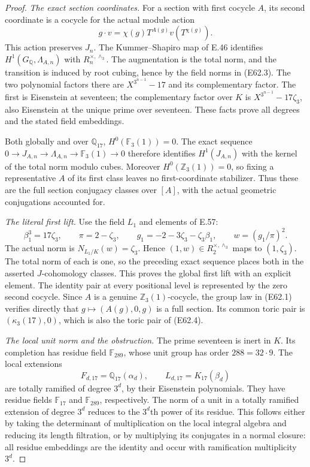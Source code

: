 \begin{proof}
\emph{The exact section coordinates.}
For a section with first cocycle $A$, its
second coordinate is a cocycle for the
actual module action
\[
       g\cdot v=\chi(g)T^{A(g)}
                                 v(T^{\chi(g)}).
 \tag{E62.10}
\]
This action preserves $J_n$.
The Kummer--Shapiro map of E.46 identifies
$H^1(G_{\mathbb Q},\Lambda_{A,n})$
with $R_n^{\times,\wedge_3}$.
The augmentation is the total norm,
and the transition is induced by
root cubing, hence by the field norms
in (E62.3).
The two polynomial factors there are
$X^{3^{n-1}}-17$ and its complementary
factor. The first is Eisenstein at
seventeen; the complementary factor
over $K$ is
$X^{3^{n-1}}-17\zeta_3$, also
Eisenstein at the unique prime over
seventeen. These facts prove all
degrees and the stated field
embeddings.

Both globally and over $\mathbb Q_{17}$,
$H^0(\mathbb F_3(1))=0$.
The exact sequence
$0\to J_{A,n}\to\Lambda_{A,n}
\to\mathbb F_3(1)\to0$ therefore
identifies $H^1(J_{A,n})$ with the
kernel of the total norm modulo cubes.
Moreover $H^0(\mathbb Z_3(1))=0$,
so fixing a representative $A$ of its
first class leaves no first-coordinate
stabilizer. Thus these are the full
section conjugacy classes over $[A]$,
with the actual geometric conjugations
accounted for.

\emph{The literal first lift.}
Use the field $L_1$ and elements of E.57:
\[
 \beta_1^3=17\zeta_3,\qquad
 \pi=2-\zeta_3,\qquad
 g_1=-2-3\zeta_3-\zeta_3\beta_1,\qquad
 w=(g_1/\pi)^2 .
 \tag{E62.11}
\]
The actual norm is
$N_{L_1/K}(w)=\zeta_3$.
Hence $(1,w)\in R_2^{\times,\wedge_3}$
maps to $(1,\zeta_3)$.
The total norm of each is one,
so the preceding exact sequence places
both in the asserted $J$-cohomology
classes. This proves the global first
lift with an explicit element.
The identity pair at every positional
level is represented by the zero
second cocycle. Since $A$ is a genuine
$\mathbb Z_3(1)$-cocycle, the group law
in (E62.1) verifies directly that
$g\mapsto(A(g),0,g)$ is a full
section. Its common toric pair is
$(\kappa_3(17),0)$, which is also
the toric pair of (E62.4).

\emph{The local unit norm and the obstruction.}
The prime seventeen is inert in $K$.
Its completion has residue field
$\mathbb F_{289}$, whose unit group
has order $288=32\cdot9$.
The local extensions
\[
 F_{d,17}=\mathbb Q_{17}(\alpha_d),
 \qquad L_{d,17}=K_{17}(\beta_d)
 \tag{E62.12}
\]
are totally ramified of degree $3^d$,
by their Eisenstein polynomials.
They have residue fields
$\mathbb F_{17}$ and $\mathbb F_{289}$,
respectively. The norm of a unit in a
totally ramified extension of degree
$3^d$ reduces to the $3^d$th power
of its residue. This follows either
by taking the determinant of
multiplication on the local integral
algebra and reducing its length
filtration, or by multiplying its
conjugates in a normal closure:
all residue embeddings are the
identity and occur with ramification
multiplicity $3^d$.


\end{proof}
